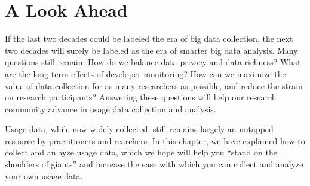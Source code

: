 \section{A Look Ahead}

If the last two decades could be labeled the era
of big data collection, 
the next two decades will surely be labeled as the 
era of smarter big data analysis.
Many questions still remain:
How do we balance data privacy and data richness?
What are the long term effects of developer monitoring?
How can we maximize the value of data collection
for as many researchers as possible, and reduce the 
strain on research participants?
Answering these questions will help our research
community advance in usage data collection and analysis.

Usage data, while now widely collected, still remains largely 
an untapped resource by practitioners and rearchers.
In this chapter, we have explained how to collect and 
anlayze usage data, which we hope will help you ``stand
on the shoulders of giants'' and increase the ease
with which you can collect and analyze your own usage data.